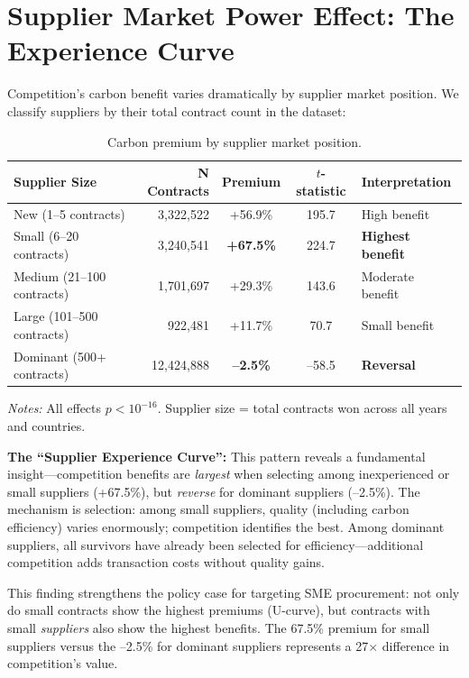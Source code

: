 \documentclass[11pt]{article}
\newcommand{\tabnoteblock}[1]{%
    \par\vspace{0.45em}%
    \begin{minipage}{0.98\linewidth}
    \footnotesize\raggedright #1
    \end{minipage}\par
}
\newcommand{\tabnotes}[1]{\tabnoteblock{\textit{Notes:} #1}}
\begin{document}
\section{Supplier Market Power Effect: The Experience Curve}

Competition's carbon benefit varies dramatically by supplier market position. We classify suppliers by their total contract count in the dataset:

\begin{table}[H]
\centering
\caption{Carbon premium by supplier market position.}
\label{tab:supplierpower}
\begin{tabular}{lrccl}
\toprule
\textbf{Supplier Size} & \textbf{N Contracts} & \textbf{Premium} & \textbf{$t$-statistic} & \textbf{Interpretation} \\
\midrule
New (1--5 contracts) & 3,322,522 & +56.9\% & 195.7 & High benefit \\
Small (6--20 contracts) & 3,240,541 & \textbf{+67.5\%} & 224.7 & \textbf{Highest benefit} \\
Medium (21--100 contracts) & 1,701,697 & +29.3\% & 143.6 & Moderate benefit \\
Large (101--500 contracts) & 922,481 & +11.7\% & 70.7 & Small benefit \\
Dominant (500+ contracts) & 12,424,888 & \textbf{--2.5\%} & --58.5 & \textbf{Reversal} \\
\bottomrule
\end{tabular}

\tabnotes{All effects $p < 10^{-16}$. Supplier size = total contracts won across all years and countries.
}
\end{table}

\textbf{The ``Supplier Experience Curve'':} This pattern reveals a fundamental insight---competition benefits are \textit{largest} when selecting among inexperienced or small suppliers (+67.5\%), but \textit{reverse} for dominant suppliers (--2.5\%). The mechanism is selection: among small suppliers, quality (including carbon efficiency) varies enormously; competition identifies the best. Among dominant suppliers, all survivors have already been selected for efficiency---additional competition adds transaction costs without quality gains.

This finding strengthens the policy case for targeting SME procurement: not only do small contracts show the highest premiums (U-curve), but contracts with small \textit{suppliers} also show the highest benefits. The 67.5\% premium for small suppliers versus the --2.5\% for dominant suppliers represents a 27$\times$ difference in competition's value.
\end{document}

